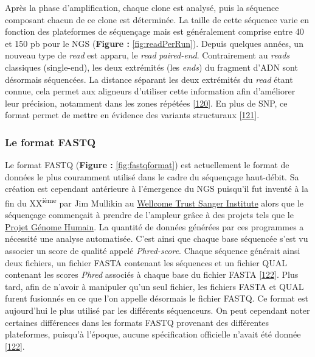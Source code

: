\documentclass[12pt,twoside]{reedthesis}
\theoremstyle{definition}
\theoremstyle{definition}
\theoremstyle{remark}
\begin{document}
  Après la phase d'amplification, chaque clone est analysé, puis la
  séquence composant chacun de ce clone est déterminée. La taille de cette
  séquence varie en fonction des plateformes de séquençage mais est
  généralement comprise entre 40 et 150 pb pour le NGS (\textbf{Figure :
  }\ref{fig:readPerRun}). Depuis quelques années, un nouveau type de
  \emph{read} est apparu, le \emph{read} \emph{paired-end}. Contrairement
  au \emph{reads} classiques (single-end), les deux extrémités (les
  \emph{ends}) du fragment d'ADN sont désormais séquencées. La distance
  séparant les deux extrémités du \emph{read} étant connue, cela permet
  aux aligneurs d'utiliser cette information afin d'améliorer leur
  précision, notamment dans les zones répétées
  {[}\protect\hyperlink{ref-Li2008}{120}{]}. En plus de SNP, ce format
  permet de mettre en évidence des variants structuraux
  {[}\protect\hyperlink{ref-Korbel2009}{121}{]}.
  
  \newpage
  
  \subsubsection{Le format FASTQ}\label{fastq}
  
  Le format FASTQ (\textbf{Figure : }\ref{fig:fastqformat}) est
  actuellement le format de données le plus couramment utilisé dans le
  cadre du séquençage haut-débit. Sa création est cependant antérieure à
  l'émergence du NGS puisqu'il fut inventé à la fin du
  XX\textsuperscript{ième} par Jim Mullikin au
  \href{https://fr.wikipedia.org/wiki/Wellcome_Trust_Sanger_Institute}{Wellcome
  Trust Sanger Institute} alors que le séquençage commençait à prendre de
  l'ampleur grâce à des projets tels que le
  \href{https://fr.wikipedia.org/wiki/Projet_G\%C3\%A9nome_Humain}{Projet
  Génome Humain}. La quantité de données générées par ces programmes a
  nécessité une analyse automatisée. C'est ainsi que chaque base séquencée
  s'est vu associer un score de qualité appelé \emph{Phred-score}. Chaque
  séquence générait ainsi deux fichiers, un fichier FASTA contenant les
  séquences et un fichier QUAL contenant les scores \emph{Phred} associés
  à chaque base du fichier FASTA
  {[}\protect\hyperlink{ref-Cock2009}{122}{]}. Plus tard, afin de n'avoir
  à manipuler qu'un seul fichier, les fichiers FASTA et QUAL furent
  fusionnés en ce que l'on appelle désormais le fichier FASTQ. Ce format
  est aujourd'hui le plus utilisé par les différents séquenceurs. On peut
  cependant noter certaines différences dans les formats FASTQ provenant
  des différentes plateformes, puisqu'à l'époque, aucune spécification
  officielle n'avait été donnée
  {[}\protect\hyperlink{ref-Cock2009}{122}{]}.
  
\end{document}
